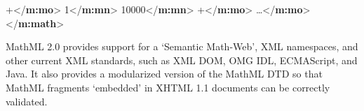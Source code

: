 \begin{shaded}
\hspace*{1em}\mbox{}\newline 
{}\mbox{}\newline 
{}+{</\textbf{m:mo}>}\mbox{}\newline 
{}\mbox{}\newline 
\hspace*{1em}\mbox{}\newline 
\hspace*{1em}\hspace*{1em}1{</\textbf{m:mn}>}\mbox{}\newline 
\hspace*{1em}\mbox{}\newline 
\hspace*{1em}\mbox{}\newline 
\hspace*{1em}\hspace*{1em}10000{</\textbf{m:mn}>}\mbox{}\newline 
\hspace*{1em}\mbox{}\newline 
{}\mbox{}\newline 
{}+{</\textbf{m:mo}>}\mbox{}\newline 
{}…{</\textbf{m:mo}>}\mbox{}\newline 
{</\textbf{m:math}>}\end{shaded}\egroup\par \par
MathML 2.0 provides support for a ‘Semantic Math-Web’, XML namespaces, and other current XML standards, such as XML DOM, OMG IDL, ECMAScript, and Java. It also provides a modularized version of the MathML DTD so that MathML fragments ‘embedded’ in XHTML 1.1 documents  can be correctly validated.\par
